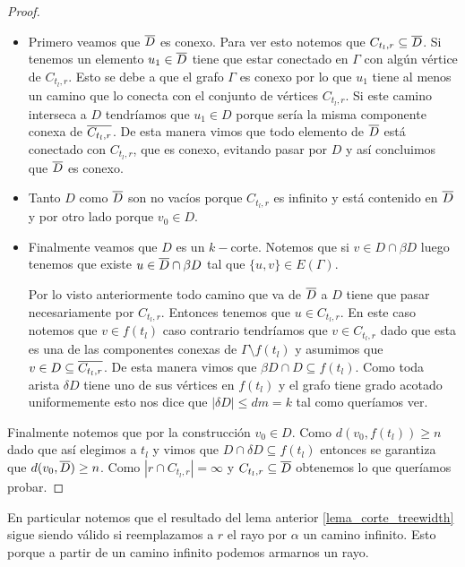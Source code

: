 \documentclass[tesis.tex]{subfiles}
\begin{document}
\begin{proof}
	\begin{itemize}
		\item 	
		Primero veamos que $\overline D$ es conexo.
		Para ver esto notemos que $C_{t_{l},r} \subseteq \overline D$. 
		Si tenemos un elemento $u_1 \in \overline D$ tiene que estar conectado en $\Gamma$ con algún vértice de $C_{t_l, r}$.
		Esto se debe a que el grafo $\Gamma$ es conexo por lo que $u_{1}$ tiene al menos un camino que lo conecta con el conjunto de vértices $C_{t_{l},r}$.
		Si este camino interseca a $D$ tendríamos que $u_{1} \in D$ porque sería la misma componente conexa de $\overline{ C_{t_l, r}}$.
		De esta manera vimos que todo elemento de $\overline D$ está conectado con  $C_{t_l, r}$, que es conexo, evitando pasar por $D$ y así concluimos que $\overline D$ es conexo.
		\item 
		Tanto $D$ como $\overline D$ son no vacíos porque $C_{t_l, r}$ es infinito y está contenido en $\overline D$ y por otro lado porque $v_0 \in D$.
		\item
		Finalmente veamos que $D$ es un $k-$corte.
		Notemos que si $v \in D \cap \beta D$ luego tenemos que existe $u \in \overline D \cap \beta D$ tal que $\{u,v\} \in E(\Gamma)$.
		
		Por lo visto anteriormente todo camino que va de $\overline D$ a $D$ tiene que pasar necesariamente por $C_{t_l, r}$. 
		Entonces tenemos que $u \in C_{t_l, r}$.
		En este caso notemos que $v \in f{(t_l)}$ caso contrario tendríamos que $v \in C_{t_l, r}$ dado que esta es una de las componentes conexas de $\Gamma \setminus f{(t_l)}$ y asumimos que $v \in D \subseteq \overline{C_{t_{l},r}}$.
		De esta manera vimos que $\beta D \cap D \subseteq f{(t_l)}$.
		Como toda arista $\delta D$ tiene uno de sus vértices en $f(t_{l})$ y el grafo tiene grado acotado uniformemente esto nos dice que $|\delta D| \le dm = k$ tal como queríamos ver. 
		
	\end{itemize}
	
Finalmente notemos que por la construcción $v_{0} \in D$.
Como $d(v_{0}, f(t_{l})) \ge n$ dado que así elegimos a $t_{l}$ 
y vimos que $D \cap \delta D \subseteq f(t_{l})$
entonces se garantiza que $d(v_{0}, \overline D) \ge n$. 
Como $|r \cap C_{t_{l},r}| = \infty$ y $C_{t_{l},r} \subseteq \overline D$ obtenemos lo que queríamos probar.
	
\end{proof}

\begin{obs}\label{obs_corte_tw}
	En particular notemos que el resultado del lema anterior \ref{lema_corte_treewidth} sigue siendo válido si reemplazamos a $r$ el rayo por $\alpha$ un camino infinito.
	Esto porque a partir de un camino infinito podemos armarnos un rayo.
\end{obs}
\end{document}
